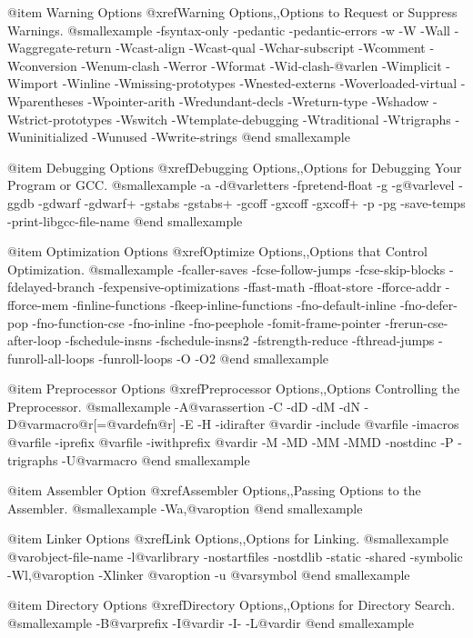 @item Warning Options
@xref{Warning Options,,Options to Request or Suppress Warnings}.
@smallexample
-fsyntax-only  -pedantic  -pedantic-errors
-w  -W  -Wall  -Waggregate-return  -Wcast-align  
-Wcast-qual  -Wchar-subscript  -Wcomment  -Wconversion
-Wenum-clash  -Werror  -Wformat  -Wid-clash-@var{len}
-Wimplicit  -Wimport  -Winline  -Wmissing-prototypes
-Wnested-externs  -Woverloaded-virtual  -Wparentheses
-Wpointer-arith  -Wredundant-decls  -Wreturn-type
-Wshadow  -Wstrict-prototypes  -Wswitch
-Wtemplate-debugging  -Wtraditional  -Wtrigraphs
-Wuninitialized  -Wunused  -Wwrite-strings
@end smallexample

@item Debugging Options
@xref{Debugging Options,,Options for Debugging Your Program or GCC}.
@smallexample
-a  -d@var{letters}  -fpretend-float 
-g  -g@var{level} -ggdb  -gdwarf -gdwarf+
-gstabs  -gstabs+  -gcoff -gxcoff  -gxcoff+
-p  -pg  -save-temps  -print-libgcc-file-name
@end smallexample

@item Optimization Options
@xref{Optimize Options,,Options that Control Optimization}.
@smallexample
-fcaller-saves  -fcse-follow-jumps  -fcse-skip-blocks
-fdelayed-branch   -fexpensive-optimizations  
-ffast-math  -ffloat-store  -fforce-addr  -fforce-mem
-finline-functions  -fkeep-inline-functions  
-fno-default-inline  -fno-defer-pop  -fno-function-cse
-fno-inline  -fno-peephole  -fomit-frame-pointer  
-frerun-cse-after-loop  -fschedule-insns  
-fschedule-insns2  -fstrength-reduce  -fthread-jumps 
-funroll-all-loops  -funroll-loops
-O  -O2
@end smallexample

@item Preprocessor Options
@xref{Preprocessor Options,,Options Controlling the Preprocessor}.
@smallexample
-A@var{assertion}  -C  -dD  -dM  -dN
-D@var{macro}@r{[}=@var{defn}@r{]}  -E  -H
-idirafter @var{dir}
-include @var{file}  -imacros @var{file}
-iprefix @var{file}  -iwithprefix @var{dir}
-M  -MD  -MM  -MMD  -nostdinc  -P  -trigraphs  -U@var{macro}
@end smallexample

@item Assembler Option
@xref{Assembler Options,,Passing Options to the Assembler}.
@smallexample
-Wa,@var{option}
@end smallexample

@item Linker Options
@xref{Link Options,,Options for Linking}.
@smallexample
@var{object-file-name}
-l@var{library}  -nostartfiles  -nostdlib  
-static  -shared  -symbolic  
-Wl,@var{option}  -Xlinker @var{option}
-u @var{symbol}
@end smallexample

@item Directory Options
@xref{Directory Options,,Options for Directory Search}.
@smallexample
-B@var{prefix}  -I@var{dir}  -I-  -L@var{dir}
@end smallexample

